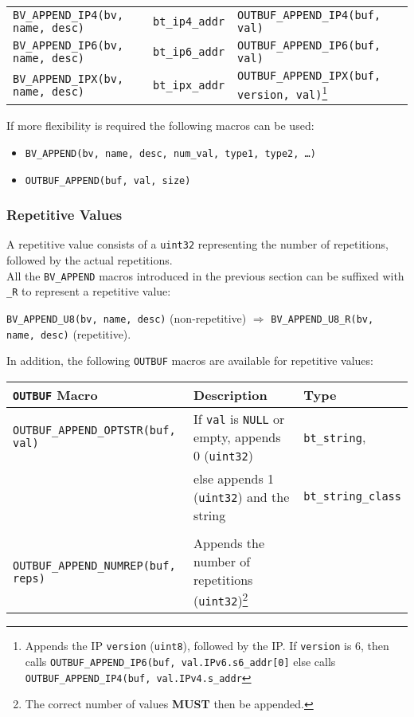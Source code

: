 \documentclass[documentation]{subfiles}
\begin{document}
\begin{longtable}{lll}
    {\tt BV\_APPEND\_IP4(bv, name, desc)} & {\tt bt\_ip4\_addr} & {\tt OUTBUF\_APPEND\_IP4(buf, val)}\\
    {\tt BV\_APPEND\_IP6(bv, name, desc)} & {\tt bt\_ip6\_addr} & {\tt OUTBUF\_APPEND\_IP6(buf, val)}\\
    {\tt BV\_APPEND\_IPX(bv, name, desc)} & {\tt bt\_ipx\_addr} & {\tt OUTBUF\_APPEND\_IPX(buf, version, val)}\footnote{Appends the IP {\tt version} ({\tt uint8}), followed by the IP. If {\tt version} is 6, then calls {\tt OUTBUF\_APPEND\_IP6(buf, val.IPv6.s6\_addr[0]} else calls {\tt OUTBUF\_APPEND\_IP4(buf, val.IPv4.s\_addr}}\\

    \bottomrule
\end{longtable}

If more flexibility is required the following macros can be used:
\begin{itemize}
    \item {\tt BV\_APPEND(bv, name, desc, num\_val, type1, type2, \ldots)}
    \item {\tt OUTBUF\_APPEND(buf, val, size)}
\end{itemize}

\subsubsection{Repetitive Values}

A repetitive value consists of a {\tt uint32} representing the number of repetitions, followed by the actual repetitions.\\

All the {\tt BV\_APPEND} macros introduced in the previous section can be suffixed with {\tt \_R} to represent a repetitive value:
\begin{center}
    {\tt BV\_APPEND\_U8(bv, name, desc)} (non-repetitive) $\Rightarrow$ {\tt BV\_APPEND\_U8\_R(bv, name, desc)} (repetitive).
\end{center}

In addition, the following {\tt OUTBUF} macros are available for repetitive values:

\begin{longtable}{lll}
    \toprule
    {\bf {\tt OUTBUF} Macro} & {\bf Description} & {\bf Type}\\
    \midrule
    {\tt OUTBUF\_APPEND\_OPTSTR(buf, val)} & If {\tt val} is {\tt NULL} or empty, appends 0 ({\tt uint32}) & {\tt bt\_string},\\
                                           & else appends 1 ({\tt uint32}) and the string                 & {\tt bt\_string\_class}\\\\
    {\tt OUTBUF\_APPEND\_NUMREP(buf, reps)} & Appends the number of repetitions ({\tt uint32})\footnote{The correct number of values {\bf MUST} then be appended.}\\

    \bottomrule
\end{longtable}
\end{document}
